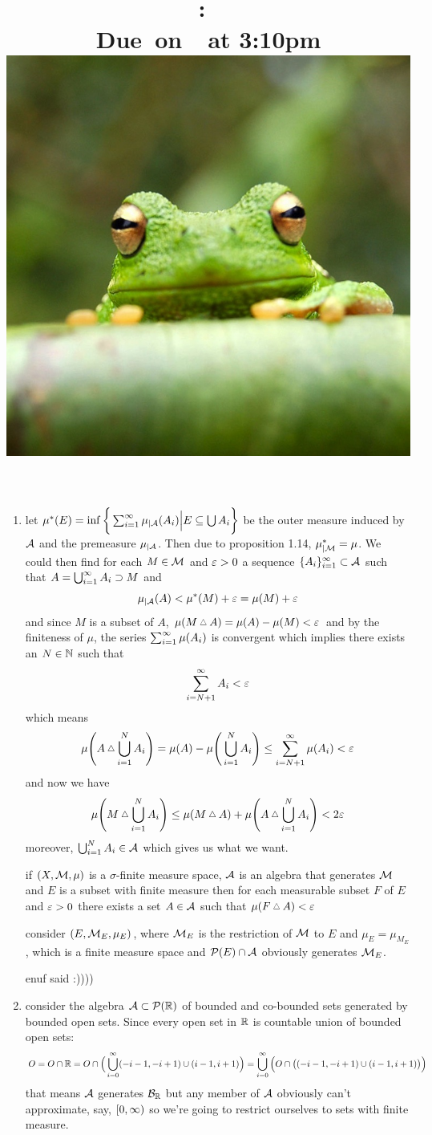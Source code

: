 \documentclass{article}
\title{
    \vspace{2in}
    \textmd{\textbf{\hmwkClass:\ \hmwkTitle}}\\
    \normalsize\vspace{0.1in}\small{Due\ on\ \hmwkDueDate\ at 3:10pm}\\
    \includegraphics[scale=0.2]{frog} \\
    \vspace{0.1in}\large{\textit{\hmwkClassTime}}
    \vspace{3in}
}
\author{\hmwkAuthorName}
\date{}
\begin{document}
\maketitle

\pagebreak 

\begin{homeworkProblem}
    \begin{enumerate}[label=\alph*.]
        \item let $\mu^*(E)=\inf\bigg\{\sum_{i=1}^\infty\mu_{|\mathcal{A}}(A_i)\Big| E\subseteq \bigcup A_i\bigg\}$ be the outer measure induced by $\mathcal{A}$ and the premeasure $\mu_{|\mathcal{A}}$. Then due to proposition 1.14, $\mu^*_{|\mathcal{M}}=\mu$. We could then find for each $M\in\mathcal{M}$ and $\varepsilon>0$ a sequence $\{A_i\}_{i=1}^\infty\subset\mathcal{A}$ such that $A=\bigcup_{i=1}^\infty A_i \supset M$ and
        \[
            \mu_{|\mathcal{A}}(A) < \mu^*(M)+\varepsilon = \mu(M)+\varepsilon
        \]
        and since $M$ is a subset of $A$, $\mu(M \symdiff A) = \mu(A)-\mu(M) < \eps$ and by the finiteness of $\mu$, the series $\sum_{i=1}^\infty \mu(A_i)$ is convergent which implies there exists an $N\in\mathbb{N}$ such that
        \[
            \sum_{i=N+1}^\infty A_i<\varepsilon
        \]
        which means
        \[
            \mu\Bigg(A \symdiff \bigcup_{i=1}^N A_i\Bigg) = \mu(A)-\mu\Bigg(\bigcup_{i=1}^N A_i\Bigg) \leq \sum_{i=N+1}^\i \mu(A_i)< \eps
        \]
        and now we have
        \[
            \mu\Bigg(M \symdiff \bigcup_{i=1}^N A_i\Bigg) \leq \mu(M \symdiff A) + \mu\Bigg(A \symdiff \bigcup_{i=1}^N A_i\Bigg) < 2\eps
        \]
        moreover, $\bigcup_{i=1}^N A_i \in \mathcal{A}$ which gives us what we want.

        \begin{corollary}
            if $(X, \mathcal{M}, \mu)$ is a $\sigma$-finite measure space, $\mathcal{A}$ is an algebra that generates $\mathcal{M}$ and $E$ is a subset with finite measure then for each measurable subset $F$ of $E$ and $\varepsilon>0$ there exists a set $A \in \mathcal{A}$ such that $\mu(F \symdiff A)<\eps$
        \end{corollary}
        \begin{trivialproof}
            consider $(E, \mathcal{M}_E, \mu_E)$, where $\mathcal{M}_E$ is the restriction of $\mathcal{M}$ to $E$ and $\mu_E=\mu_{M_E}$, which is a finite measure space and $\mathcal{P}(E)\cap\mathcal{A}$ obviously generates $\mathcal{M}_E$.

            enuf said :))))
        \end{trivialproof}
        \item consider the algebra $\mathcal{A} \subset \mathcal{P}(\mathbb{R})$ of bounded and co-bounded sets generated by bounded open sets. Since every open set in $\mathbb{R}$ is countable union of bounded open sets: 
        \[
            O=O \cap \mathbb{R}=O \cap \Big(\bigcup_{i=0}^\infty (-i-1, -i+1) \cup (i-1, i+1)\Big)= \bigcup_{i=0}^\infty \Big(O\cap \big((-i-1, -i+1) \cup (i-1, i+1)\big)\Big)
        \]
        that means $\mathcal{A}$ generates $\mathcal{B}_{\mathbb{R}}$ but any member of $\mathcal{A}$ obviously can't approximate, say, $[0, \infty)$ so we're going to restrict ourselves to sets with finite measure.


\end{enumerate}
\end{homeworkProblem}
\end{document}
